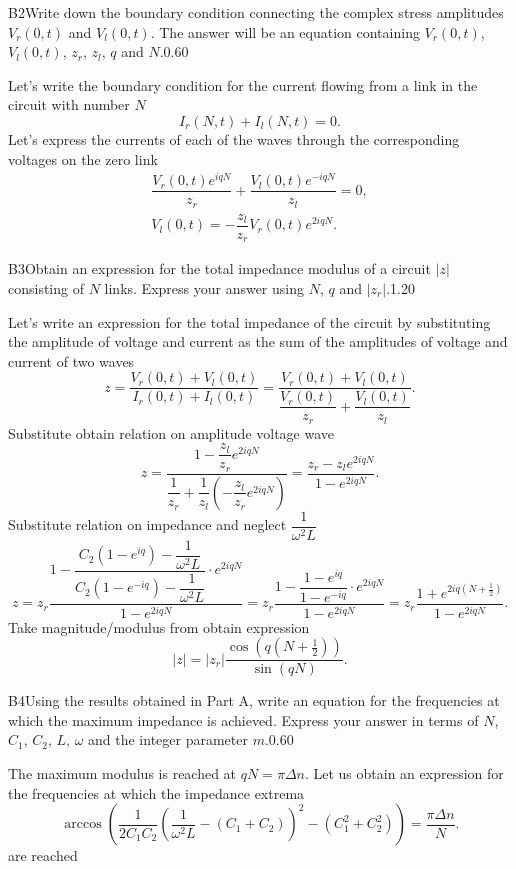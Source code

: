 \documentclass[11pt,a4paper]{article}
\begin{document}
\begin{solcard}{B2}{Write down the boundary condition connecting the complex stress amplitudes $V_r(0,t)$ and $V_l(0,t)$. The answer will be an equation containing $V_r(0,t)$, $V_l(0,t)$, $z_{r}$, $z_{l}$, $q$ and $N$.}{0.60}

Let's write the boundary condition for the current flowing from a link in the circuit with number $N$ $$I_r(N,t)+I_l(N,t)=0.$$ Let's express the currents of each of the waves through the corresponding voltages on the zero link \begin{align*}\dfrac{V_r(0,t)e^{iqN}}{z_r}+\dfrac{V_l(0,t)e^{-iqN}}{z_l}=0,\\ V_l(0,t)=-\dfrac{z_l}{z_r}V_r(0,t)e^{2iqN}.\end{align*}

\end{solcard}

\begin{solcard}{B3}{Obtain an expression for the total impedance modulus of a circuit $|z|$ consisting of $N$ links. Express your answer using $N$, $q$ and $|z_r|$.}{1.20}

Let's write an expression for the total impedance of the circuit by substituting the amplitude of voltage and current as the sum of the amplitudes of voltage and current of two waves $$z=\dfrac{V_r(0,t)+V_l(0,t)}{I_r(0,t)+I_l(0,t)}=\dfrac{V_r(0,t)+V_l(0,t)}{\dfrac{V_r(0,t)}{z_r}+\dfrac{V_l(0,t)}{z_l}}.$$Substitute obtain relation on amplitude voltage wave $$z=\dfrac{1-\dfrac{z_l}{z_r}e^{2iqN}}{\dfrac{1}{z_r}+\dfrac{1}{z_l}\left(-\dfrac{z_l}{z_r}e^{2iqN}\right)}=\dfrac{z_r-z_le^{2iqN}}{1-e^{2iqN}}.$$Substitute relation on impedance and neglect $\dfrac{1}{\omega^2L}$ $$z=z_r\dfrac{1-\dfrac{C_2\left(1-e^{iq}\right)-\dfrac{1}{\omega^2L}}{C_2\left(1-e^{-iq}\right)-\dfrac{1}{\omega^2L}}\cdot e^{2iqN}}{1-e^{2iqN}}=z_r\dfrac{1-\dfrac{1-e^{iq}}{1-e^{-iq}}\cdot e^{2iqN}}{1-e^{2iqN}}=z_r\dfrac{1+e^{2iq\left(N+\frac{1}{2}\right)}}{1-e^{2iqN}}.$$Take magnitude/modulus from obtain expression $$|z|=|z_r|\dfrac{\cos{\left(q\left(N+\frac{1}{2}\right)\right)}}{\sin{\left(qN\right)}}.$$

\end{solcard}

\begin{solcard}{B4}{Using the results obtained in Part A, write an equation for the frequencies at which the maximum impedance is achieved. Express your answer in terms of $N$, $C_1$, $C_2$, $L$, $\omega$ and the integer parameter $m$.}{0.60}

The maximum modulus is reached at $qN=\pi \Delta n$. Let us obtain an expression for the frequencies at which the impedance extrema $$\arccos{\left(\dfrac{1}{2C_1C_2}\left(\dfrac{1}{\omega^2L}-\left(C_1+C_2\right)\right)^2-\left(C_1^2+C_2^2\right)\right)}=\dfrac{\pi \Delta n}{N}.$$ are reached

\end{solcard}
\end{document}
